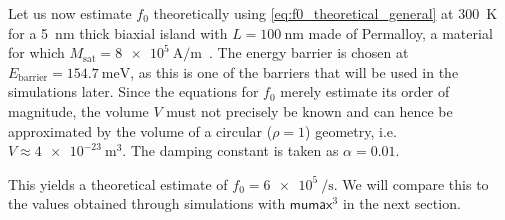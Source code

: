 \documentclass[11pt,a4paper,english,twoside]{article}
\newcommand{\mumax}{$\mathsf{mumax}^3$}
\begin{document}
Let us now estimate $f_0$ theoretically using \cref{eq:f0_theoretical_general} at \SI{300}{\kelvin} for a \SI{5}{\nano\metre} thick biaxial island with $L=\SI{100}{\nano\metre}$ made of Permalloy, a material for which $M_\mathrm{sat}=\SI{8e5}{\ampere\per\metre}$~\cite{MuMax3}. The energy barrier is chosen at $E_\mathrm{barrier}=\SI{154.7}{\milli\electronvolt}$, as this is one of the barriers that will be used in the simulations later. Since the equations for $f_0$ merely estimate its order of magnitude, the volume $V$ must not precisely be known and can hence be approximated by the volume of a circular ($\rho=1$) geometry, i.e. $V\approx\SI{4e-23}{\metre\cubed}$. The damping constant is taken as $\alpha=0.01$. \par
This yields a theoretical estimate of $f_0 = \SI{6e5}{\per\second}$. We will compare this to the values obtained through simulations with \mumax{} in the next section.
\end{document}
